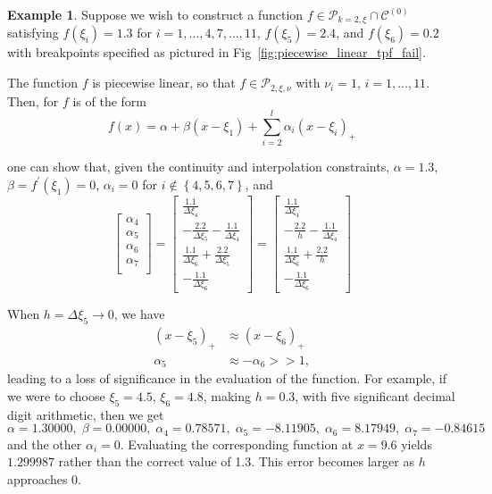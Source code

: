 \documentclass[12pt]{article}
\newcommand{\PP}{\mathcal{P}}
\theoremstyle{definition}
\newtheorem{example}{Example}[section]
\begin{document}
\begin{example} \label{ex:tpf_fail}
Suppose we wish to construct a function $f \in \PP_{k=2,\xi} \cap \mathscr{C}^{\left(0\right)}$ satisfying $f\left(\xi_i \right)=1.3$ for $i=1,\dots,4,7,\dots,11$, $f\left(\xi_5\right)=2.4$, and $f\left(\xi_6\right)=0.2$ with breakpoints specified as pictured in Fig~\ref{fig:piecewise_linear_tpf_fail}. 


The function $f$ is piecewise linear, so that $f \in \PP_{2,\xi,\nu}$ with $\nu_i=1$, $i=1,\dots, 11$. Then, for $f$ is of the form
\[
f\left(x\right) = \alpha + \beta\left(x-\xi_1\right) + \sum_{i=2}^l\alpha_i\left(x-\xi_i\right)_+
\]
\noindent

one can show that, given the continuity and interpolation constraints, $\alpha = 1.3$, $\beta = f^\prime\left(\xi_1\right) = 0$,  $\alpha_i = 0$ for $i \not \in \left\{4,5,6,7\right\}$, and 
\[
\begin{bmatrix}
\alpha_4\\
\alpha_5\\
\alpha_6\\
\alpha_7\\
\end{bmatrix} =  \begin{bmatrix}
\frac{1.1}{\Delta\xi_4}\\
-\frac{2.2}{\Delta \xi_5} -\frac{1.1}{\Delta\xi_4}\\
\frac{1.1}{\Delta\xi_6} + \frac{2.2}{\Delta \xi_5}\\
-\frac{1.1}{\Delta\xi_6} 
\end{bmatrix} = \begin{bmatrix}
\frac{1.1}{\Delta\xi_4}\\
-\frac{2.2}{h} -\frac{1.1}{\Delta\xi_4}\\
\frac{1.1}{\Delta\xi_6} + \frac{2.2}{h}\\
-\frac{1.1}{\Delta\xi_6} 
\end{bmatrix}
\]

When $h = \Delta \xi_5 \rightarrow 0$, we have 
\begin{align*}
\left(x-\xi_5\right)_+ &\approx \left(x-\xi_6\right)_+\\
\alpha_5  &\approx -\alpha_6 >> 1,
\end{align*}
\noindent
leading to a loss of significance in the evaluation of the function. For example, if we were to choose $\xi_5=4.5$, $\xi_6=4.8$, making $h=0.3$, with five significant decimal digit arithmetic, then we get
\[
\alpha=1.30000,\; \beta= 0.00000,\;\alpha_4= 0.78571,\;\alpha_5= -8.11905,\;\alpha_6= 8.17949,\;\alpha_7= -0.84615
\]
and the other $\alpha_i=0$. Evaluating the corresponding function at $x=9.6$ yields $1.299987$ rather than the correct value of 1.3. This error becomes larger as $h$ approaches 0.
\end{example}
\end{document}
